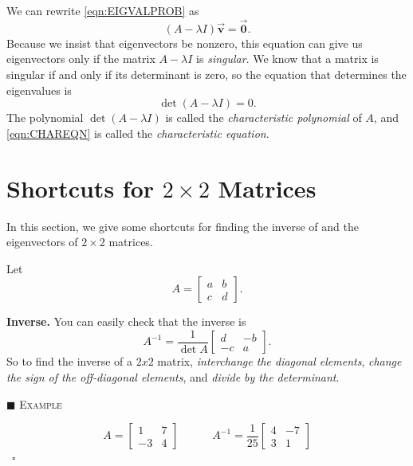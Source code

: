 \documentclass[reqno]{immbook}
\newcommand{\BV}{\vec{\textbf{v}}}
\newcommand{\BZero}{\vec{\textbf{0}}}  %
\numberwithin{equation}{chapter}
\numberwithin{question}{section}
\numberwithin{theorem}{chapter}
\numberwithin{figure}{chapter}
\theoremstyle{definition}
\newenvironment{xexample}%
{%

\medskip\noindent\addtocounter{example}{1}$\blacksquare$ \textsc{Example \theexample}\hspace*{1em}%
}%
{%
~\hfill$\square$

\medskip
}
\begin{document}
We can rewrite \eqref{eqn:EIGVALPROB} as
\begin{equation}
   \left(A - \lambda I\right) \BV = \BZero.
\end{equation}
Because we insist that eigenvectors be nonzero,
this equation can give us eigenvectors only if
the matrix $A-\lambda I$ is \emph{singular}.
We know that a matrix is singular if and only if
its determinant is zero, so the equation that determines
the eigenvalues is
\begin{equation}
   \det\left(A-\lambda I\right) = 0.
   \label{eqn:CHAREQN}
\end{equation}
The polynomial $\det\left(A-\lambda I\right)$ is called
the \emph{characteristic polynomial}
of $A$, and
\eqref{eqn:CHAREQN} is 
called the \emph{characteristic equation}.
%
\newpage
%
\section{Shortcuts for $2\times 2$ Matrices}
In this section, we give
some shortcuts for finding the inverse of and the eigenvectors of $2\times 2$ matrices.

Let
\[
   A = \begin{bmatrix}
              a & b \\ c & d
       \end{bmatrix}.
\]

\noindent
\textbf{Inverse.}
You can easily check that the inverse is
\[
   A^{-1} = \frac{1}{\det A}\begin{bmatrix}
                               d & -b \\ -c & a
                            \end{bmatrix}.
\]
So to find the inverse of a $2x2$ matrix,
\emph{interchange the diagonal elements}, \emph{change the sign of the off-diagonal elements}, and
\emph{divide by the determinant}.

\begin{xexample}
\[
  A = \begin{bmatrix}
          1 & 7 \\ -3 & 4
      \end{bmatrix}
  \quad\quad\quad
  A^{-1} = \frac{1}{25}\begin{bmatrix}
                          4 & -7 \\ 3 & 1
                       \end{bmatrix}
\]
\end{xexample}
\end{document}
